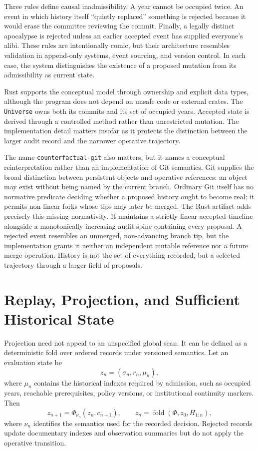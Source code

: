 \documentclass[11pt]{article}
\begin{document}
Three rules define causal inadmissibility. A year cannot be occupied twice. An event in which history itself ``quietly replaced'' something is rejected because it would erase the committee reviewing the commit. Finally, a legally distinct apocalypse is rejected unless an earlier accepted event has supplied everyone's alibi. These rules are intentionally comic, but their architecture resembles validation in append-only systems, event sourcing, and version control. In each case, the system distinguishes the existence of a proposed mutation from its admissibility as current state.

Rust supports the conceptual model through ownership and explicit data types, although the program does not depend on unsafe code or external crates. The \texttt{Universe} owns both its commits and its set of occupied years. Accepted state is derived through a controlled method rather than unrestricted mutation. The implementation detail matters insofar as it protects the distinction between the larger audit record and the narrower operative trajectory.

The name \texttt{counterfactual-git} also matters, but it names a conceptual reinterpretation rather than an implementation of Git semantics. Git supplies the broad distinction between persistent objects and operative references: an object may exist without being named by the current branch. Ordinary Git itself has no normative predicate deciding whether a proposed history ought to become real; it permits non-linear forks whose tips may later be merged. The Rust artifact adds precisely this missing normativity. It maintains a strictly linear accepted timeline alongside a monotonically increasing audit spine containing every proposal. A rejected event resembles an unmerged, non-advancing branch tip, but the implementation grants it neither an independent mutable reference nor a future merge operation. History is not the set of everything recorded, but a selected trajectory through a larger field of proposals.

\section{Replay, Projection, and Sufficient Historical State}

Projection need not appeal to an unspecified global scan. It can be defined as a deterministic fold over ordered records under versioned semantics. Let an evaluation state be
\begin{equation}
  z_n=(\sigma_n,r_n,\mu_n),
  \label{eq:evaluation-state}
\end{equation}
where $\mu_n$ contains the historical indexes required by admission, such as occupied years, reachable prerequisites, policy versions, or institutional continuity markers. Then
\begin{equation}
  z_{n+1}=\Phi_{\nu_n}(z_n,c_{n+1}),
  \qquad
  z_n=\operatorname{fold}(\Phi,z_0,H_{1:n}),
  \label{eq:projection-fold}
\end{equation}
where $\nu_n$ identifies the semantics used for the recorded decision. Rejected records update documentary indexes and observation summaries but do not apply the operative transition.
\end{document}
